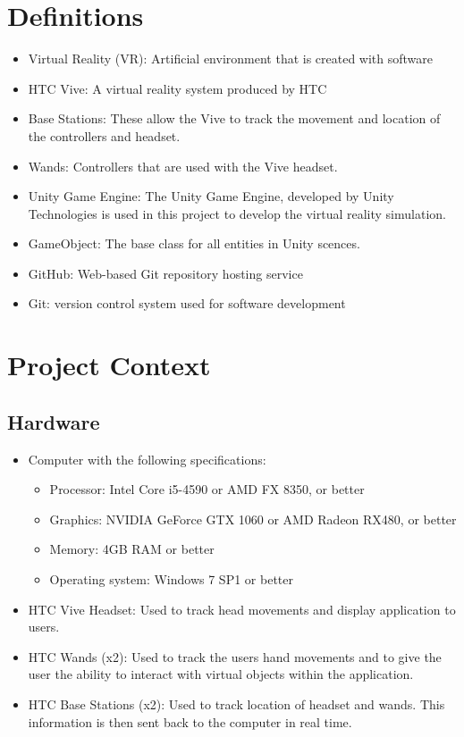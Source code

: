 \documentclass[10pt,journal,compsoc,onecolumn, draftclsnofoot]{IEEEtran}
\begin{document}
\section{Definitions}
\begin{itemize}
  \item Virtual Reality (VR):  Artificial environment that is created with software
  \item HTC Vive: A virtual reality system produced by HTC
  \item Base Stations: These allow the Vive to track the movement and location of the controllers and headset.
  \item Wands: Controllers that are used with the Vive headset.
  \item Unity Game Engine: The Unity Game Engine, developed by Unity Technologies is used in this project to develop the virtual reality simulation.
  \item GameObject: The base class for all entities in Unity scences.
  \item GitHub: Web-based Git repository hosting service
  \item Git: version control system used for software development
\end{itemize}

\section{Project Context}
\subsection{Hardware}
\begin{itemize}
  \item Computer with the following specifications:
  \begin{itemize}
    \item Processor: Intel Core i5-4590 or AMD FX 8350, or better
    \item Graphics: NVIDIA GeForce GTX 1060 or AMD Radeon RX480, or better
    \item Memory: 4GB RAM or better
    \item Operating system: Windows 7 SP1 or better
  \end{itemize}
  \item HTC Vive Headset: Used to track head movements and display application to users.
  \item HTC Wands (x2): Used to track the users hand movements and to give the user the ability to interact with virtual objects within the application.
  \item HTC Base Stations (x2): Used to track location of headset and wands. This information is then sent back to the computer in real time.
\end{itemize}
\end{document}
